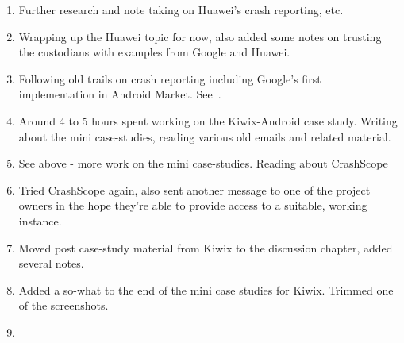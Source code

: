 \begin{enumerate}
    \item Further research and note taking on Huawei's crash reporting, etc.
    \item Wrapping up the Huawei topic for now, also added some notes on trusting the custodians with examples from Google and Huawei.
    \item Following old trails on crash reporting including Google's first implementation in Android Market. See~\href{{chapter-crash-recording-and-reporting-in-android}}{}.
    \item Around 4 to 5 hours spent working on the Kiwix-Android case study. Writing about the mini case-studies, reading various old emails and related material.
    \item See above - more work on the mini case-studies. Reading about CrashScope
    \item Tried CrashScope again, also sent another message to one of the project owners in the hope they're able to provide access to a suitable, working instance.
    \item Moved post case-study material from Kiwix to the discussion chapter, added several notes.
    \item Added a so-what to the end of the mini case studies for Kiwix. Trimmed one of the screenshots.
    \item 
\end{enumerate}

